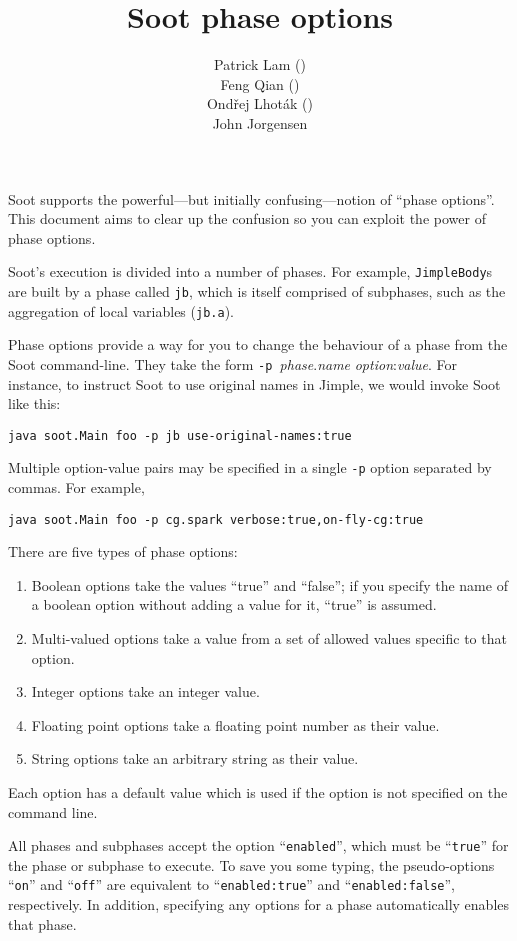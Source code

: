 \documentclass{article}
\title{Soot phase options}
\author{Patrick Lam (\htmladdnormallink{plam@sable.mcgill.ca}{mailto:plam@sable.mcgill.ca})\\
Feng Qian (\htmladdnormallink{fqian@sable.mcgill.ca}{mailto:fqian@sable.mcgill.ca})\\
Ond\v{r}ej Lhot\'ak (\htmladdnormallink{olhotak@sable.mcgill.ca}{mailto:olhotak@sable.mcgill.ca})\\
John Jorgensen\\ 
}
\begin{document}
\maketitle

Soot supports the powerful---but initially confusing---notion of
``phase options''.  This document aims to clear up the confusion so
you can exploit the power of phase options.

Soot's execution is divided into a number of phases.  For example,
{\tt JimpleBody}s are built by a phase called {\tt jb}, which is
itself comprised of subphases, such as the aggregation of local
variables ({\tt jb.a}).

Phase options provide a way for you to
change the behaviour of a phase from the Soot command-line.  They take
the form {\tt -p }{\em phase}.{\em name} 
{\em option}:{\em value}.  For instance,
to instruct Soot to use original names in Jimple, we would invoke Soot
like this:
\begin{verbatim}
java soot.Main foo -p jb use-original-names:true
\end{verbatim}
Multiple option-value pairs may be specified in a single {\tt -p} option
separated by commas. For example,
\begin{verbatim}
java soot.Main foo -p cg.spark verbose:true,on-fly-cg:true
\end{verbatim}

There are five types of phase options:
\begin{enumerate}
\item Boolean options take the values
``true'' and ``false''; if you specify the name of a boolean option without adding a value for it, ``true'' is assumed.
\item
Multi-valued options take a value from a set of allowed values
specific to that option.
\item Integer options
take an integer value. 
\item Floating point options take a 
floating point number as their value. 
\item String options take an arbitrary
string as their value.
\end{enumerate}

Each option has a default value which is used if the option is not
specified on the command line.

All phases and subphases accept the option ``{\tt enabled}'', which
must be ``{\tt true}'' for the phase or subphase to execute. To save
you some typing, the pseudo-options ``{\tt on}'' and ``{\tt off}''
are equivalent to ``{\tt enabled:true}'' and ``{\tt enabled:false}'',
respectively. In addition, specifying any options for a phase
automatically enables that phase.
\end{document}
